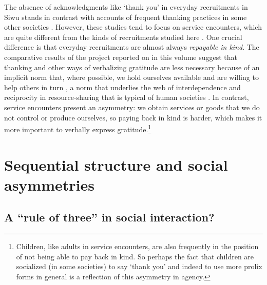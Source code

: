 \documentclass[output=paper]{langsci/langscibook}
\begin{document}
The absence of acknowledgments like ‘thank you’ in everyday recruitments in Siwu stands in contrast with accounts of frequent thanking practices in some other societies \citep{aston_say_1995,becker_spontaneous_1986}. However, these studies tend to focus on service encounters, which are quite different from the kinds of recruitments studied here \citep{apte_thank_1974}. One crucial difference is that everyday recruitments are almost always \textit{repayable in kind}. The comparative results of the project reported on in this volume suggest that thanking and other ways of verbalizing gratitude are less necessary because of an implicit norm that, where possible, we hold ourselves available and are willing to help others in turn \citep{FloydEtAl2018}, a norm that underlies the web of interdependence and reciprocity in resource-sharing that is typical of human societies \citep{melis_one_2016}. In contrast, service encounters present an asymmetry: we obtain services or goods that we do not control or produce ourselves, so paying back in kind is harder, which makes it more important to verbally express gratitude.\footnote{Children, like adults in service encounters, are also frequently in the position of not being able to pay back in kind. So perhaps the fact that children are socialized (in some societies) to say ‘thank you’ and indeed to use more prolix forms in general is a reflection of this asymmetry in agency.}

\section{Sequential structure and social asymmetries}\label{sec:dingemanse:5}
\subsection{A “rule of three” in social interaction?}\label{sec:dingemanse:5.1}
\end{document}
